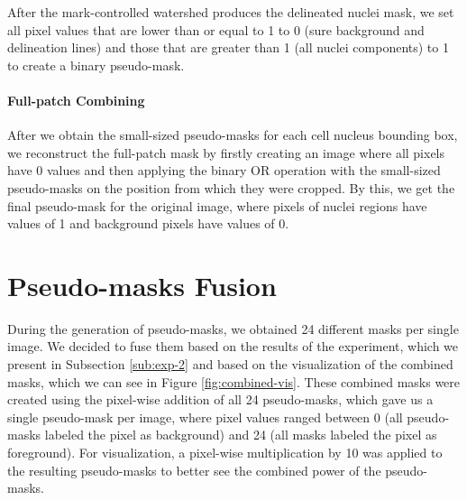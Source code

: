 After the mark-controlled watershed produces the delineated nuclei mask, we set all pixel values that are lower than or equal to 1 to 0 (sure background and delineation lines) and those that are greater than 1 (all nuclei components) to 1 to create a binary pseudo-mask.

\paragraph{Full-patch Combining}
After we obtain the small-sized pseudo-masks for each cell nucleus bounding box, we reconstruct the full-patch mask by firstly creating an image where all pixels have 0 values and then applying the binary OR operation with the small-sized pseudo-masks on the position from which they were cropped. By this, we get the final pseudo-mask for the original image, where pixels of nuclei regions have values of 1 and background pixels have values of 0.

\section{Pseudo-masks Fusion}
\label{section:mask-fusion}
During the generation of pseudo-masks, we obtained 24 different masks per single image. We decided to fuse them based on the results of the experiment, which we present in Subsection \ref{sub:exp-2} and based on the visualization of the combined masks, which we can see in Figure \ref{fig:combined-vis}. These combined masks were created using the pixel-wise addition of all 24 pseudo-masks, which gave us a single pseudo-mask per image, where pixel values ranged between 0 (all pseudo-masks labeled the pixel as background) and 24 (all masks labeled the pixel as foreground). For visualization, a pixel-wise multiplication by 10 was applied to the resulting pseudo-masks to better see the combined power of the pseudo-masks.

